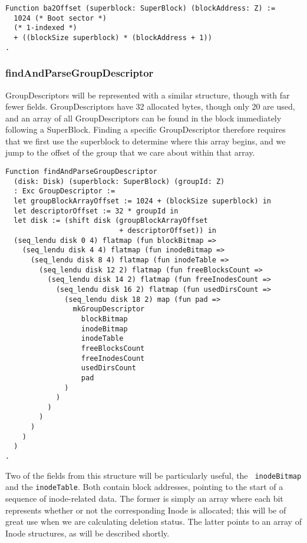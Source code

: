 \documentclass[nocopyrightspace]{sigplanconf}
\begin{document}
\begin{lstlisting}
Function ba2Offset (superblock: SuperBlock) (blockAddress: Z) :=
  1024 (* Boot sector *)
  (* 1-indexed *)
  + ((blockSize superblock) * (blockAddress + 1))
.
\end{lstlisting}

\subsubsection{findAndParseGroupDescriptor}

GroupDescriptors will be represented with a similar structure, though with far
fewer fields. GroupDescriptors have 32 allocated bytes, though only 20 are
used, and an array of all GroupDescriptors can be found in the block
immediately following a SuperBlock. Finding a specific GroupDescriptor
therefore requires that we first use the superblock to determine where this
array begins, and we jump to the offset of the group that we care about within
that array.

\begin{lstlisting}
Function findAndParseGroupDescriptor 
  (disk: Disk) (superblock: SuperBlock) (groupId: Z)
  : Exc GroupDescriptor :=
  let groupBlockArrayOffset := 1024 + (blockSize superblock) in
  let descriptorOffset := 32 * groupId in
  let disk := (shift disk (groupBlockArrayOffset 
                           + descriptorOffset)) in
  (seq_lendu disk 0 4) flatmap (fun blockBitmap =>
    (seq_lendu disk 4 4) flatmap (fun inodeBitmap =>
      (seq_lendu disk 8 4) flatmap (fun inodeTable =>
        (seq_lendu disk 12 2) flatmap (fun freeBlocksCount =>
          (seq_lendu disk 14 2) flatmap (fun freeInodesCount =>
            (seq_lendu disk 16 2) flatmap (fun usedDirsCount =>
              (seq_lendu disk 18 2) map (fun pad =>
                mkGroupDescriptor
                  blockBitmap
                  inodeBitmap
                  inodeTable
                  freeBlocksCount
                  freeInodesCount
                  usedDirsCount
                  pad
              )
            )
          )
        )
      )
    )
  )
.
\end{lstlisting}

Two of the fields from this structure will be particularly useful, the {\tt
inodeBitmap} and the {\tt inodeTable}. Both contain block addresses, pointing
to the start of a sequence of inode-related data. The former is simply an
array where each bit represents whether or not the corresponding Inode is
allocated; this will be of great use when we are calculating deletion status.
The latter points to an array of Inode structures, as will be described
shortly.
\end{document}
